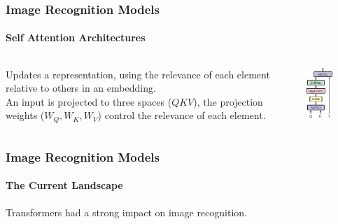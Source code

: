\begin{frame}[t]
    \frametitle{Image Recognition Models}
    \framesubtitle{Self Attention Architectures}
    \begin{columns}
         {\footnotesize Updates a representation, using the relevance of each element relative to others in an 
         embedding.\\\vspace{10pt}
         An input is projected to three spaces ($Q K V$), the projection weights ($W_Q, W_K, W_V$) control 
         the relevance of each element.}
        \begin{center}
            \includegraphics[width=0.5\textwidth]{fig/rel/imrecon/img/scaled_dotproduct.pdf}
        \end{center}
        
    \end{columns}
    
\end{frame}
\begin{frame}[t]
    \frametitle{Image Recognition Models}
    \framesubtitle{The Current Landscape}
    Transformers had a strong impact on image recognition. 
    
    
\end{frame}